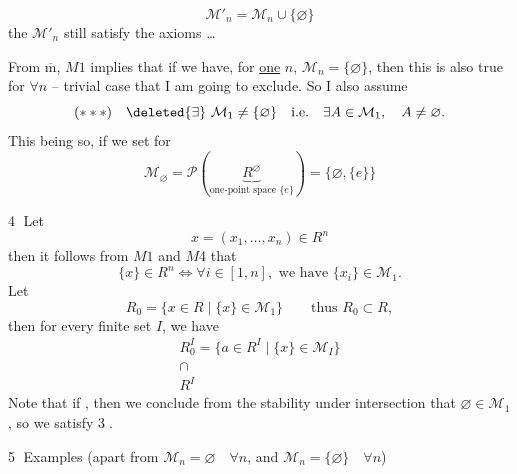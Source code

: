\[
\mathcal M'_n=\mathcal M_n\cup\{\varnothing\}
\]
the $\mathcal M'_n$ still satisfy the axioms \ldots


From $\overline{\mathrm m}$,  $M1$ implies that if we have, for \uline{one} $n$,  $\mathcal M_n=\{\varnothing\}$, then this is also true for $\forall n$ -- trivial case  that I am going to exclude. So I also assume
\[
(***)\quad\deleted{\exists}\ \mathcal M_1\ne\{\varnothing\}\quad\text{i.e.}\quad\exists A\in\mathcal M_1,\quad A\ne\varnothing.
\]
This being so, if we set for 
\[
\mathcal M_\varnothing=\mathcal P(\underbrace{R^\varnothing}_{\text{one-point space }\{e\}})=\{\varnothing,\{e\}\}
\]

\textcircled{4} Let 
\[
x=(x_1,\ldots,x_n)\in R^n
\]
then it follows from $M1$ and $M4$ that
\[
\{x\}\in R^n\Longleftrightarrow\forall i\in[1,n],\text{ we have }\{x_i\}\in\mathcal M_1.
\]
Let
\[
R_0=\{x\in R\mid\{x\}\in\mathcal M_1\}\qquad\text{thus }R_0\subset R,
\]
then for every finite set $I$, we have
\[
\begin{array}{l}
R_0^I=\{a\in R^I\mid\{x\}\in\mathcal M_I\}\\
\cap\\
R^I
\end{array}
\]
Note that if  , then we conclude from the stability  under intersection that $\varnothing\in\mathcal M_1$, so we satisfy \textcircled{3}.

\textcircled{5} Examples (apart from $\mathcal M_n=\varnothing\quad\forall n$, and $\mathcal M_n=\{\varnothing\}\quad\forall n$)
